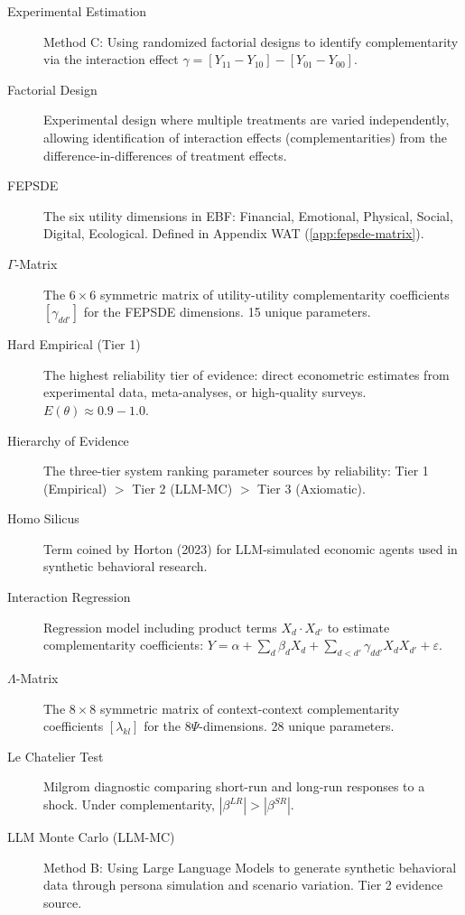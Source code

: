 \documentclass[11pt,a4paper]{article}
\theoremstyle{definition}
\begin{document}
\begin{description}
\item[Experimental Estimation]
Method C: Using randomized factorial designs to identify complementarity via 
the interaction effect $\gamma = [Y_{11} - Y_{10}] - [Y_{01} - Y_{00}]$.

\item[Factorial Design]
Experimental design where multiple treatments are varied independently, 
allowing identification of interaction effects (complementarities) from 
the difference-in-differences of treatment effects.

\item[FEPSDE]
The six utility dimensions in EBF: Financial, Emotional, Physical, 
Social, Digital, Ecological. Defined in Appendix WAT (\ref{app:fepsde-matrix}).

\item[$\Gamma$-Matrix]
The $6 \times 6$ symmetric matrix of utility-utility complementarity 
coefficients $[\gamma_{dd'}]$ for the FEPSDE dimensions. 15 unique parameters.

\item[Hard Empirical (Tier 1)]
The highest reliability tier of evidence: direct econometric estimates from 
experimental data, meta-analyses, or high-quality surveys. $E(\theta) \approx 0.9-1.0$.

\item[Hierarchy of Evidence]
The three-tier system ranking parameter sources by reliability: 
Tier 1 (Empirical) $>$ Tier 2 (LLM-MC) $>$ Tier 3 (Axiomatic).

\item[Homo Silicus]
Term coined by Horton (2023) for LLM-simulated economic agents used in 
synthetic behavioral research.

\item[Interaction Regression]
Regression model including product terms $X_d \cdot X_{d'}$ to estimate 
complementarity coefficients: $Y = \alpha + \sum_d \beta_d X_d + \sum_{d<d'} \gamma_{dd'} X_d X_{d'} + \varepsilon$.

\item[$\Lambda$-Matrix]
The $8 \times 8$ symmetric matrix of context-context complementarity 
coefficients $[\lambda_{kl}]$ for the 8$\Psi$-dimensions. 28 unique parameters.

\item[Le Chatelier Test]
Milgrom diagnostic comparing short-run and long-run responses to a shock. 
Under complementarity, $|\beta^{LR}| > |\beta^{SR}|$.

\item[LLM Monte Carlo (LLM-MC)]
Method B: Using Large Language Models to generate synthetic behavioral data 
through persona simulation and scenario variation. Tier 2 evidence source.


\end{description}
\end{document}
